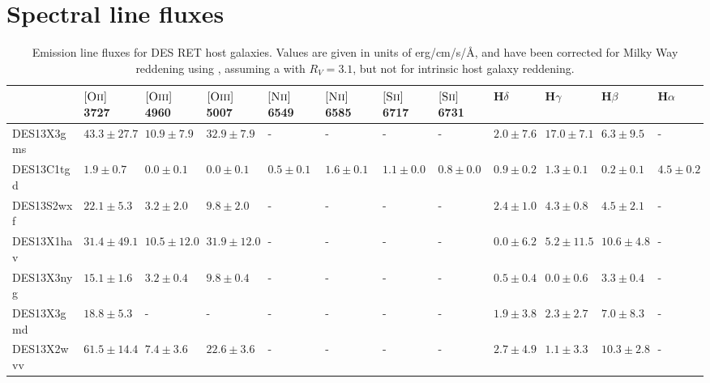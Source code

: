 \documentclass[fleqn,usenatbib,]{mnras}
\newcommand{\halpha}[0]{H$\alpha$}
\newcommand{\hbeta}[0]{H$\beta$}
\newcommand{\hgamma}[0]{H$\gamma$}
\newcommand{\hdelta}[0]{H$\delta$}
\newcommand{\OII}[0]{$[\textnormal{\textsc{Oii}}]$}
\newcommand{\OIII}[0]{$[\textnormal{\textsc{Oiii}}]$}
\newcommand{\SII}[0]{$[\textnormal{\textsc{Sii}}]$}
\newcommand{\NII}[0]{$[\textnormal{\textsc{Nii}}]$}
\begin{document}
\section{Spectral line fluxes}
\begin{table}
\caption{Emission line fluxes for DES RET host galaxies. Values are given in units of erg/cm/s/\AA, and have been corrected for Milky Way reddening using \citet{Schlegel1998}, assuming a \citet{Cardelli1989} with $R_V = 3.1$, but not for intrinsic host galaxy reddening.}
\setlength{\tabcolsep}{3pt}
\begin{tabular}{llllllllllll}
\toprule
{} &              \OII 3727 &             \OIII 4960 &              \OIII 5007 &             \NII 6549 &             \NII 6585 &             \SII 6717 &             \SII 6731 &           \hdelta &            \hgamma &             \hbeta &            \halpha \\
\midrule
DES13X3gms &  $43.3 \pm 27.7$ &   $10.9 \pm 7.9$ &    $32.9 \pm 7.9$ &               - &               - &               - &               - &   $2.0 \pm 7.6$ &   $17.0 \pm 7.1$ &    $6.3 \pm 9.5$ &                - \\
DES13C1tgd &    $1.9 \pm 0.7$ &    $0.0 \pm 0.1$ &     $0.0 \pm 0.1$ &   $0.5 \pm 0.1$ &   $1.6 \pm 0.1$ &   $1.1 \pm 0.0$ &   $0.8 \pm 0.0$ &   $0.9 \pm 0.2$ &    $1.3 \pm 0.1$ &    $0.2 \pm 0.1$ &    $4.5 \pm 0.2$ \\
DES13S2wxf &   $22.1 \pm 5.3$ &    $3.2 \pm 2.0$ &     $9.8 \pm 2.0$ &               - &               - &               - &               - &   $2.4 \pm 1.0$ &    $4.3 \pm 0.8$ &    $4.5 \pm 2.1$ &                - \\
DES13X1hav &  $31.4 \pm 49.1$ &  $10.5 \pm 12.0$ &   $31.9 \pm 12.0$ &               - &               - &               - &               - &   $0.0 \pm 6.2$ &   $5.2 \pm 11.5$ &   $10.6 \pm 4.8$ &                - \\
DES13X3nyg &   $15.1 \pm 1.6$ &    $3.2 \pm 0.4$ &     $9.8 \pm 0.4$ &               - &               - &               - &               - &   $0.5 \pm 0.4$ &    $0.0 \pm 0.6$ &    $3.3 \pm 0.4$ &                - \\
DES13X3gmd &   $18.8 \pm 5.3$ &                - &                 - &               - &               - &               - &               - &   $1.9 \pm 3.8$ &    $2.3 \pm 2.7$ &    $7.0 \pm 8.3$ &                - \\
DES13X2wvv &  $61.5 \pm 14.4$ &    $7.4 \pm 3.6$ &    $22.6 \pm 3.6$ &               - &               - &               - &               - &   $2.7 \pm 4.9$ &    $1.1 \pm 3.3$ &   $10.3 \pm 2.8$ &                - \\

\end{tabular}
\end{table}
\end{document}

